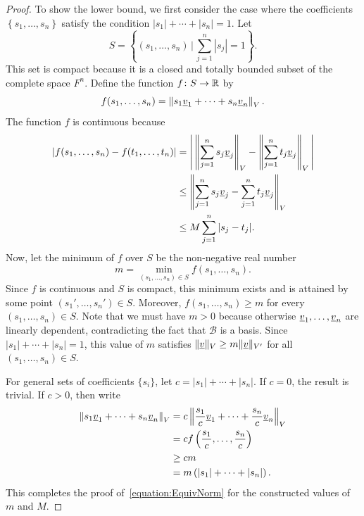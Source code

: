 \begin{proof}
To show the lower bound, we first consider the case where the coefficients $\left\{ s_1, \ldots, s_n \right\}$ satisfy the condition $|s_1| + \cdots + |s_n| = 1$.
Let
\begin{equation*}
S = \left\{ (s_1, \ldots, s_n) \,\Big| \, \sum_{j=1}^n |s_j| = 1 \right\}.
\end{equation*}
This set is compact because it is a closed and totally bounded subset of the complete space $F^n$.
Define the function $f \colon S \rightarrow \mathbb{R}$ by
\begin{equation*}
f(s_1, \ldots, s_n) = \left\| s_1 \underline{v}_1 + \cdots + s_n \underline{v}_n \right\|_V .
\end{equation*}
The function $f$ is continuous because \begin{align*}
|f(s_1, \ldots, s_n)-f(t_1, \ldots, t_n)|
&= \left| \, \left\| \sum_{j=1}^n s_j \underline{v}_j \right\|_V - \left\| \sum_{j=1}^n t_j \underline{v}_j \right\|_V \, \right|  \\
& \leq \left\| \sum_{j=1}^n s_j \underline{v}_j - \sum_{j=1}^n t_j \underline{v}_j \right\|_V \\
&\leq M \sum_{j=1}^n |s_j - t_j|.
\end{align*}
Now, let the minimum of $f$ over $S$ be the non-negative real number
\begin{equation*}
m = \min_{(s_1, \ldots, s_n) \in S} f(s_1, \ldots, s_n).
\end{equation*}
Since $f$ is continuous and $S$ is compact, this minimum exists and is attained by some point $(s_1', \ldots, s_n') \in S$.
Moreover, $f(s_1,\ldots,s_n)\ge m$ for every $(s_1,\ldots,s_n)\in S$.
Note that we must have $m > 0$ because otherwise $\underline{v}_1, \ldots, \underline{v}_n$ are linearly dependent, contradicting the fact that $\mathcal{B}$ is a basis.
Since $|s_1|+\cdots+|s_n|=1$, this value of $m$ satisfies $\| \underline{v} \|_{V} \geq m \|\underline{v}\|_{V'} $ for all $(s_1,\ldots,s_n) \in S$.

For general sets of coefficients $\{ s_i \}$, let $c = |s_1| + \cdots + |s_n|$.
If $c = 0$, the result is trivial.
If $c > 0$, then write
\begin{equation*}
\begin{split}
\left\| s_1 \underline{v}_1 + \cdots + s_n \underline{v}_n \right\|_V
&= c \left\| \frac{s_1}{c} \underline{v}_1 + \cdots + \frac{s_n}{c} \underline{v}_n \right\|_V \\
&= c f \left( \frac{s_1}{c}, \ldots, \frac{s_n}{c} \right) \\
&\geq c m \\
& = m \left( |s_1| + \cdots + |s_n| \right).
\end{split}
\end{equation*}
This completes the proof of~\eqref{equation:EquivNorm} for the constructed values of $m$ and $M$.
\end{proof}

